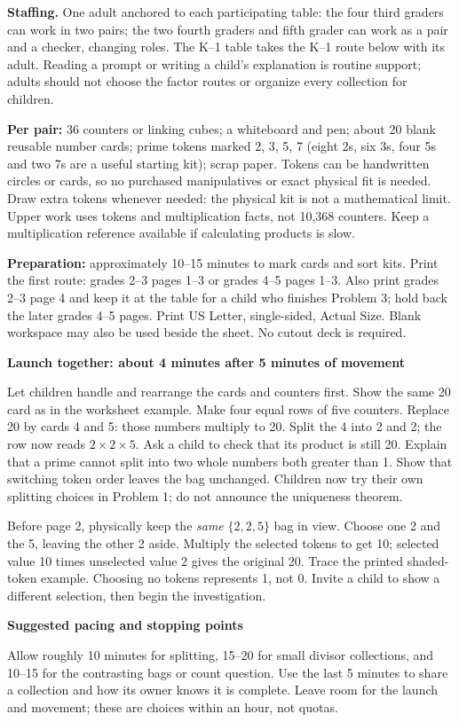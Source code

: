 \documentclass[11pt]{article}
\newcommand{\sub}[1]{\par\textbf{#1}\par}
\begin{document}
\textbf{Staffing.} One adult anchored to each participating table: the four third graders can work in two pairs; the two fourth graders and fifth grader can work as a pair and a checker, changing roles. The K--1 table takes the K--1 route below with its adult. Reading a prompt or writing a child's explanation is routine support; adults should not choose the factor routes or organize every collection for children.

\textbf{Per pair:} 36 counters or linking cubes; a whiteboard and pen; about 20 blank reusable number cards; prime tokens marked 2, 3, 5, 7 (eight 2s, six 3s, four 5s and two 7s are a useful starting kit); scrap paper. Tokens can be handwritten circles or cards, so no purchased manipulatives or exact physical fit is needed. Draw extra tokens whenever needed: the physical kit is not a mathematical limit. Upper work uses tokens and multiplication facts, not 10,368 counters. Keep a multiplication reference available if calculating products is slow.

\textbf{Preparation:} approximately 10--15 minutes to mark cards and sort kits. Print the first route: grades 2--3 pages 1--3 or grades 4--5 pages 1--3. Also print grades 2--3 page 4 and keep it at the table for a child who finishes Problem 3; hold back the later grades 4--5 pages. Print US Letter, single-sided, Actual Size. Blank workspace may also be used beside the sheet. No cutout deck is required.

\sub{Launch together: about 4 minutes after 5 minutes of movement}
Let children handle and rearrange the cards and counters first. Show the same 20 card as in the worksheet example. Make four equal rows of five counters. Replace 20 by cards 4 and 5: those numbers multiply to 20. Split the 4 into 2 and 2; the row now reads $2\times2\times5$. Ask a child to check that its product is still 20. Explain that a prime cannot split into two whole numbers both greater than 1. Show that switching token order leaves the bag unchanged. Children now try their own splitting choices in Problem 1; do not announce the uniqueness theorem.

Before page 2, physically keep the \emph{same} $\{2,2,5\}$ bag in view. Choose one 2 and the 5, leaving the other 2 aside. Multiply the selected tokens to get 10; selected value 10 times unselected value 2 gives the original 20. Trace the printed shaded-token example. Choosing no tokens represents 1, not 0. Invite a child to show a different selection, then begin the investigation.

\sub{Suggested pacing and stopping points}
Allow roughly 10 minutes for splitting, 15--20 for small divisor collections, and 10--15 for the contrasting bags or count question. Use the last 5 minutes to share a collection and how its owner knows it is complete. Leave room for the launch and movement; these are choices within an hour, not quotas.
\end{document}
